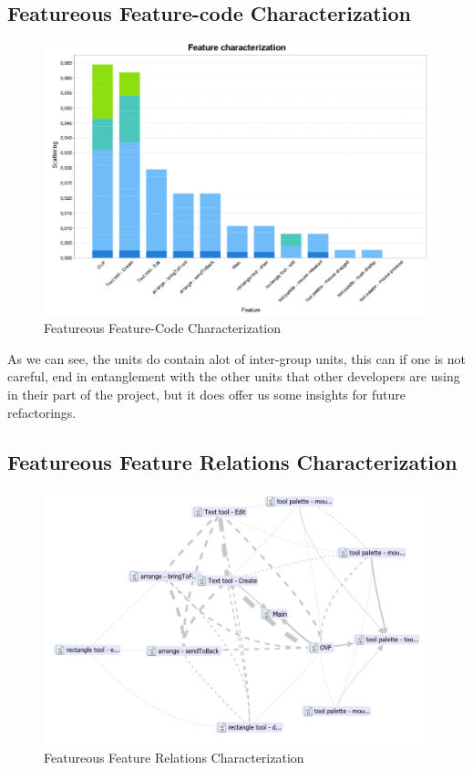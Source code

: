 \subsection{Featureous Feature-code Characterization}

\begin{figure}[H]
    \centering
    \includegraphics[width=\linewidth]{pic/Featureous Feature-Code Characterization new.png}
    \caption{Featureous Feature-Code Characterization}
    \label{fig:Featureous Feature-Code Characterization}
\end{figure}

As we can see, the units do contain alot of inter-group units, this can if one is not careful, end in entanglement with the other units that other developers
are using in their part of the project, but it does offer us some insights for future refactorings.

\subsection{Featureous Feature Relations Characterization}

\begin{figure}[H]
    \centering
    \includegraphics[width=\linewidth]{pic/Feature Relations Characterization new.png}
    \caption{Featureous Feature Relations Characterization}
    \label{fig:Featureous Feature Relations Characterization}
\end{figure}


